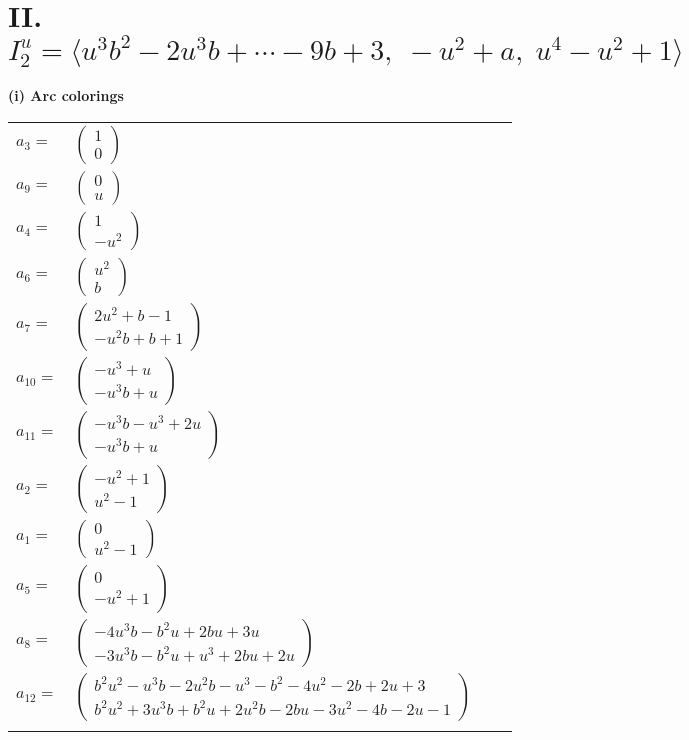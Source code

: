 \documentclass[1p]{elsarticle_modified}
\theoremstyle{definition}
\begin{document}
\centering \section*{II. $I^u_{2}= \langle u^3 b^2-2 u^3 b+\cdots-9 b+3,\;- u^2+a,\;u^4- u^2+1 \rangle$}
\flushleft \textbf{(i) Arc colorings}\\
\begin{tabular}{m{7pt} m{180pt} m{7pt} m{180pt} }
\flushright $a_{3}=$&$\begin{pmatrix}1\\0\end{pmatrix}$ \\
\flushright $a_{9}=$&$\begin{pmatrix}0\\u\end{pmatrix}$ \\
\flushright $a_{4}=$&$\begin{pmatrix}1\\- u^2\end{pmatrix}$ \\
\flushright $a_{6}=$&$\begin{pmatrix}u^2\\b\end{pmatrix}$ \\
\flushright $a_{7}=$&$\begin{pmatrix}2 u^2+b-1\\- u^2 b+b+1\end{pmatrix}$ \\
\flushright $a_{10}=$&$\begin{pmatrix}- u^3+u\\- u^3 b+u\end{pmatrix}$ \\
\flushright $a_{11}=$&$\begin{pmatrix}- u^3 b- u^3+2 u\\- u^3 b+u\end{pmatrix}$ \\
\flushright $a_{2}=$&$\begin{pmatrix}- u^2+1\\u^2-1\end{pmatrix}$ \\
\flushright $a_{1}=$&$\begin{pmatrix}0\\u^2-1\end{pmatrix}$ \\
\flushright $a_{5}=$&$\begin{pmatrix}0\\- u^2+1\end{pmatrix}$ \\
\flushright $a_{8}=$&$\begin{pmatrix}-4 u^3 b- b^2 u+2 b u+3 u\\-3 u^3 b- b^2 u+u^3+2 b u+2 u\end{pmatrix}$ \\
\flushright $a_{12}=$&$\begin{pmatrix}b^2 u^2- u^3 b-2 u^2 b- u^3- b^2-4 u^2-2 b+2 u+3\\b^2 u^2+3 u^3 b+b^2 u+2 u^2 b-2 b u-3 u^2-4 b-2 u-1\end{pmatrix}$\\&\end{tabular}
\end{document}
